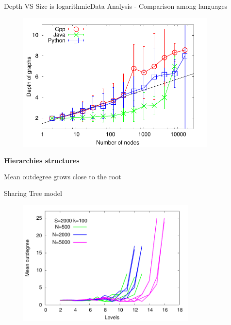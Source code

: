 \documentclass[11pt,svgnames]{beamer}
\begin{document}
\begin{frame}[noframenumbering]{Depth VS Size is logarithmic}{Data Analysis - Comparison among languages}
\begin{figure}[H]%
\includegraphics[width=10cm,draft=false]{immagini/depVSNnodes_err.pdf}
\end{figure}
\end{frame}

\begingroup
{}
\begin{frame}
\center
\textbf {\Huge {\color{white} {Hierarchies structures}}}

\end{frame}
\endgroup

\begin{frame}{Mean outdegree grows close to the root}%
\begin{tcolorbox}[colframe=PaleVioletRed]
\center
 Sharing Tree model
\end{tcolorbox}
\begin{figure}[p]%
\includegraphics[width=9cm,draft=false]{immagini/ST_OvsD.pdf}
\end{figure}
\end{frame}
\end{document}

